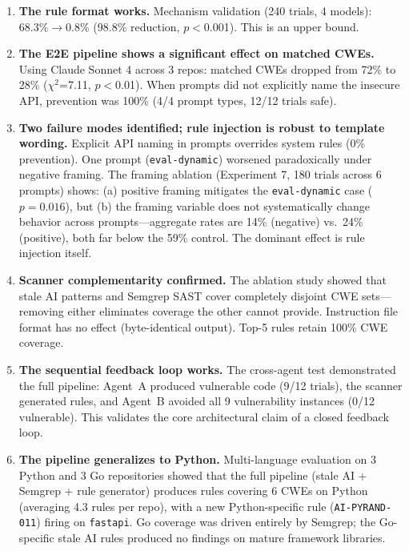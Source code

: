 \documentclass[conference,10pt]{IEEEtran}
\begin{document}
\begin{enumerate}
    \item \textbf{The rule format works.} Mechanism validation (240 trials, 4 models): 68.3\%$\rightarrow$0.8\% (98.8\% reduction, $p<$0.001). This is an upper bound.

    \item \textbf{The E2E pipeline shows a significant effect on matched CWEs.} Using Claude Sonnet 4 across 3 repos: matched CWEs dropped from 72\% to 28\% ($\chi^2$=7.11, $p<$0.01). When prompts did not explicitly name the insecure API, prevention was 100\% (4/4 prompt types, 12/12 trials safe).

    \item \textbf{Two failure modes identified; rule injection is robust to template wording.} Explicit API naming in prompts overrides system rules (0\% prevention). One prompt (\texttt{eval-dynamic}) worsened paradoxically under negative framing. The framing ablation (Experiment 7, 180 trials across 6 prompts) shows: (a) positive framing mitigates the \texttt{eval-dynamic} case ($p{=}0.016$), but (b) the framing variable does not systematically change behavior across prompts---aggregate rates are 14\% (negative) vs.\ 24\% (positive), both far below the 59\% control. The dominant effect is rule injection itself.

    \item \textbf{Scanner complementarity confirmed.} The ablation study showed that stale AI patterns and Semgrep SAST cover completely disjoint CWE sets---removing either eliminates coverage the other cannot provide. Instruction file format has no effect (byte-identical output). Top-5 rules retain 100\% CWE coverage.

    \item \textbf{The sequential feedback loop works.} The cross-agent test demonstrated the full pipeline: Agent~A produced vulnerable code (9/12 trials), the scanner generated rules, and Agent~B avoided all 9 vulnerability instances (0/12 vulnerable). This validates the core architectural claim of a closed feedback loop.

    \item \textbf{The pipeline generalizes to Python.} Multi-language evaluation on 3 Python and 3 Go repositories showed that the full pipeline (stale AI + Semgrep + rule generator) produces rules covering 6 CWEs on Python (averaging 4.3 rules per repo), with a new Python-specific rule (\texttt{AI-PYRAND-011}) firing on \texttt{fastapi}. Go coverage was driven entirely by Semgrep; the Go-specific stale AI rules produced no findings on mature framework libraries.
\end{enumerate}
\end{document}
